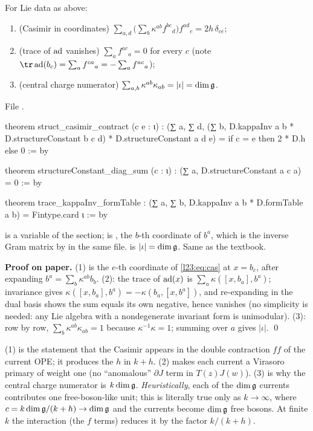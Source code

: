 \begin{proposition}\label{l23:prop:finite}
For Lie data as above:
\begin{enumerate}
\item (Casimir in coordinates) $\sum_{a,d}\big(\sum_b\kappa^{ab}f^{bc}{}_d\big)f^{ad}{}_e=2h\,\delta_{ce}$;
\item (trace of $\operatorname{ad}$ vanishes) $\sum_a f^{ac}{}_a=0$ for every $c$ (note $\tr\lxxiiiad(b_c)=\sum_af^{ca}{}_a=-\sum_af^{ac}{}_a$);
\item (central charge numerator) $\sum_{a,b}\kappa^{ab}\kappa_{ab}=|\iota|=\dim\mathfrak g$.
\end{enumerate}
\end{proposition}
\noindent File .
\begin{leancode}
theorem struct_casimir_contract (c e : ι) :
    (∑ a, ∑ d, (∑ b, D.kappaInv a b * D.structureConstant b c d) * D.structureConstant a d e) =
      if c = e then 2 * D.h else 0 := by

theorem structureConstant_diag_sum (c : ι) : (∑ a, D.structureConstant a c a) = 0 := by

theorem trace_kappaInv_formTable :
    (∑ a, ∑ b, D.kappaInv a b * D.formTable a b) = Fintype.card ι := by
\end{leancode}

\begin{dictionary}
 is a variable of the section;  is ,
the $b$-th coordinate of $b^a$, which is the inverse Gram matrix by  in the same file.
 is $|\iota|=\dim\mathfrak g$. Same as the textbook.
\end{dictionary}

\textbf{Proof on paper.} (1) is the $e$-th coordinate of \eqref{l23:eq:cas} at $x=b_c$, after expanding
$b^a=\sum_b\kappa^{ab}b_b$. (2): the trace of $\operatorname{ad}(x)$ is $\sum_a\kappa([x,b_a],b^a)$; invariance gives
$\kappa([x,b_a],b^a)=-\kappa(b_a,[x,b^a])$, and re-expanding in the dual basis shows the sum equals its own negative,
hence vanishes (no simplicity is needed: any Lie algebra with a nondegenerate invariant form is unimodular).
(3): row by row, $\sum_b\kappa^{ab}\kappa_{ab}=1$ because $\kappa^{-1}\kappa=1$; summing over $a$ gives $|\iota|$. \qed

\begin{physics}
(1) is the statement that the Casimir appears in the double contraction $f f$ of the current OPE; it produces the
$h$ in $k+h$. (2) makes each current a Virasoro primary of weight one (no ``anomalous'' $\partial J$ term in
$T(z)J(w)$). (3) is why the central charge numerator is $k\dim\mathfrak g$. \emph{Heuristically}, each of the $\dim\mathfrak g$
currents contributes one free-boson-like unit; this is literally true only as $k\to\infty$, where $c=k\dim\mathfrak g/(k+h)\to\dim\mathfrak g$
and the currents become $\dim\mathfrak g$ free bosons. At finite $k$ the interaction (the $f$ terms) reduces it by the factor $k/(k+h)$.
\end{physics}

